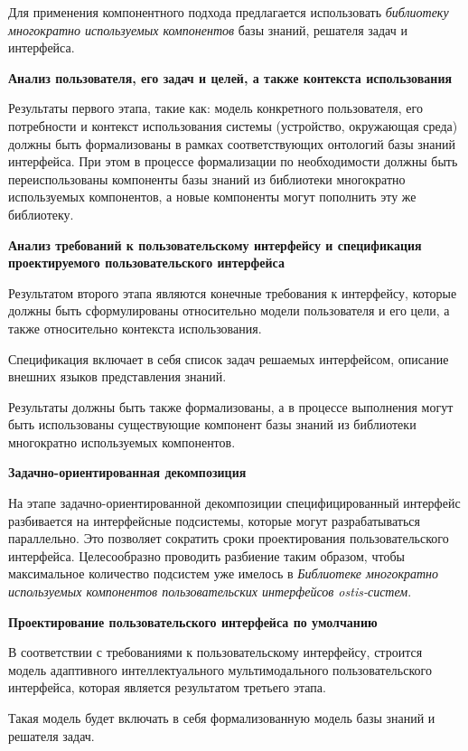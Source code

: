 Для применения компонентного подхода предлагается использовать \textit{библиотеку многократно используемых компонентов} базы знаний, решателя задач и интерфейса.

\textbf{Анализ пользователя, его задач и целей, а также контекста использования}

Результаты первого этапа, такие как: модель конкретного пользователя, его потребности и контекст использования системы (устройство, окружающая среда) должны быть формализованы в рамках соответствующих онтологий базы знаний интерфейса. 
При этом в процессе формализации по необходимости должны быть переиспользованы компоненты базы знаний из библиотеки многократно используемых компонентов, а новые компоненты могут пополнить эту же библиотеку.

\textbf{Анализ требований к пользовательскому интерфейсу и спецификация проектируемого пользовательского интерфейса}

Результатом второго этапа являются конечные требования к интерфейсу, которые должны быть сформулированы относительно модели пользователя и его цели, а также относительно контекста использования.

Спецификация включает в себя список задач решаемых интерфейсом, описание
внешних языков представления знаний.

Результаты должны быть также формализованы, а в процессе выполнения могут быть использованы существующие компонент базы знаний из библиотеки многократно используемых компонентов.

\textbf{Задачно-ориентированная декомпозиция}

На этапе задачно-ориентированной декомпозиции специфицированный 
интерфейс разбивается на интерфейсные подсистемы, которые могут разрабатываться
параллельно. Это позволяет сократить сроки проектирования пользовательского интерфейса.
Целесообразно проводить разбиение таким образом, чтобы максимальное количество
подсистем уже имелось в \textit{Библиотеке многократно используемых компонентов пользовательских интерфейсов ostis-систем}.

\textbf{Проектирование пользовательского интерфейса по умолчанию}

В соответствии с требованиями к пользовательскому интерфейсу, строится модель адаптивного интеллектуального мультимодального пользовательского интерфейса, которая является результатом третьего этапа.

Такая модель будет включать в себя формализованную модель базы знаний и решателя задач.

